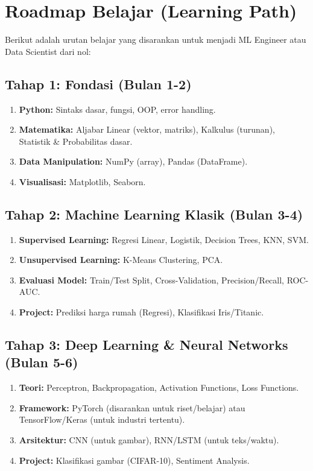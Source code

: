 \section{Roadmap Belajar (Learning Path)}

Berikut adalah urutan belajar yang disarankan untuk menjadi ML Engineer atau Data Scientist dari nol:

\subsection{Tahap 1: Fondasi (Bulan 1-2)}
\begin{enumerate}
    \item \textbf{Python:} Sintaks dasar, fungsi, OOP, error handling.
    \item \textbf{Matematika:} Aljabar Linear (vektor, matriks), Kalkulus (turunan), Statistik \& Probabilitas dasar.
    \item \textbf{Data Manipulation:} NumPy (array), Pandas (DataFrame).
    \item \textbf{Visualisasi:} Matplotlib, Seaborn.
\end{enumerate}

\subsection{Tahap 2: Machine Learning Klasik (Bulan 3-4)}
\begin{enumerate}
    \item \textbf{Supervised Learning:} Regresi Linear, Logistik, Decision Trees, KNN, SVM.
    \item \textbf{Unsupervised Learning:} K-Means Clustering, PCA.
    \item \textbf{Evaluasi Model:} Train/Test Split, Cross-Validation, Precision/Recall, ROC-AUC.
    \item \textbf{Project:} Prediksi harga rumah (Regresi), Klasifikasi Iris/Titanic.
\end{enumerate}

\subsection{Tahap 3: Deep Learning \& Neural Networks (Bulan 5-6)}
\begin{enumerate}
    \item \textbf{Teori:} Perceptron, Backpropagation, Activation Functions, Loss Functions.
    \item \textbf{Framework:} PyTorch (disarankan untuk riset/belajar) atau TensorFlow/Keras (untuk industri tertentu).
    \item \textbf{Arsitektur:} CNN (untuk gambar), RNN/LSTM (untuk teks/waktu).
    \item \textbf{Project:} Klasifikasi gambar (CIFAR-10), Sentiment Analysis.
\end{enumerate}


